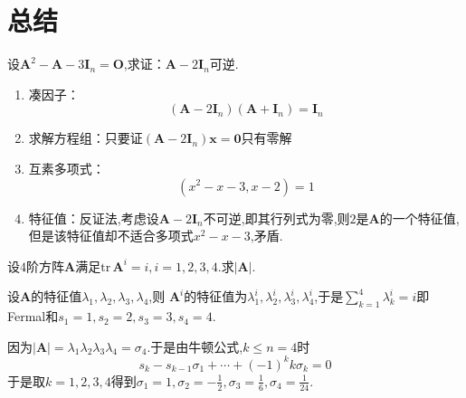 \section{总结}
\begin{brown}
\begin{example}
    设$\bm{A}^2-\bm{A}-3\bm{I}_n=\bm{O}$,求证：$\bm{A}-2\bm{I}_n$可逆.
\end{example}
\begin{Proof}
\begin{enumerate}[label={\textup{(
    \arabic*
)}}]
    \item 凑因子：\[
    \left(\bm{A}-2\bm{I}_n\right)\left(\bm{A}+\bm{I}_n\right)=\bm{I}_n
    \]
    \item 求解方程组：只要证$\left(
        \bm{A}-2\bm{I}_n
    \right)\bm{x}=\bm{0}$只有零解
    \item 互素多项式：\[
    \left(
        x^2-x-3,x-2
    \right)=1
    \]
    \item 特征值：反证法,考虑设$\bm{A}-2\bm{I}_n$不可逆,即其行列式为零,则$2$是$\bm{A}$的一个特征值,但是该特征值却不适合多项式$x^2-x-3$,矛盾.\qedhere
\end{enumerate}
\end{Proof}
\end{brown}
\begin{brown}
\begin{example}
    设$4$阶方阵$\bm{A}$满足$\mathrm{tr}\,\bm{A}^i=i,i=1,2,3,4$.求$\left|\bm{A}\right|$.
\end{example}
\begin{solution}
    设$\bm{A}$的特征值$\lambda_1,\lambda_2,\lambda_3,\lambda_4$,则
    $\bm{A}^i$的特征值为$\lambda_1^i,\lambda_2^i,\lambda_3^i,\lambda_4^i$,于是$\displaystyle
    \sum_{k=1}^{4}\lambda_k^i=i$即\textup{Fermal}和$s_1=1,s_2=2,s_3=3,s_4=4.$

    因为$\left|\bm{A}\right|=\lambda_1\lambda_2\lambda_3\lambda_4=\sigma_4$.于是由牛顿公式,$k\leqslant n=4$时
    \[
    s_k-s_{k-1}\sigma_1+\cdots+\left(-1\right)^kk\sigma_k=0
    \]
    于是取$k=1,2,3,4$得到$\displaystyle
    \sigma_1=1,\sigma_2=-\frac{1}{2},\sigma_3=\frac{1}{6},\sigma_4=\frac{1}{24}.$
\end{solution}
\end{brown}
